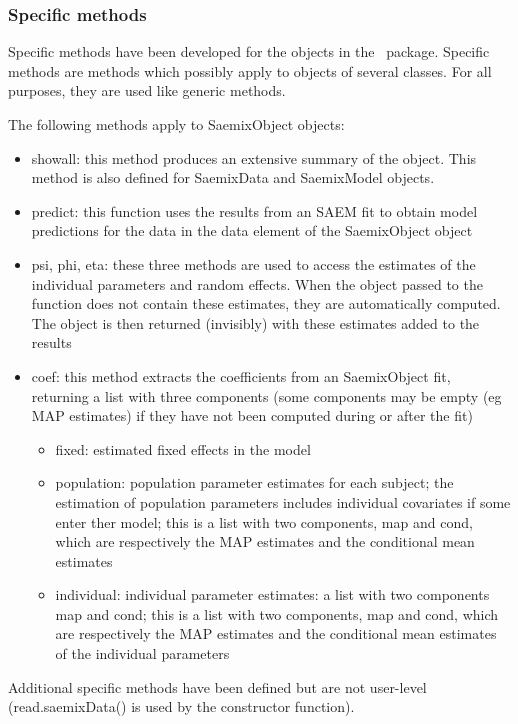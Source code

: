 \subsubsection{Specific methods}

Specific methods have been developed for the objects in the \monolix~package. Specific methods are methods which possibly apply to objects of several classes. For all purposes, they are used like generic methods.

The following methods apply to {\sf SaemixObject} objects:
\begin{itemize}
\item showall: this method produces an extensive summary of the object. This method is also defined for {\sf SaemixData} and {\sf SaemixModel} objects.
\item predict: this function uses the results from an SAEM fit to obtain model predictions for the data in the {\sf data} element of the {\sf SaemixObject} object
\item psi, phi, eta: these three methods are used to access the estimates of the individual parameters and random effects.  When the object passed to the function does not contain these estimates, they are automatically computed. The object is then returned (invisibly) with these estimates added to the results
\item coef: this method extracts the coefficients from an {\sf SaemixObject} fit, returning a list with three components (some components may be empty (eg MAP estimates) if they have not been computed during or after the fit)
   \begin{itemize}
   \item fixed: estimated fixed effects in the model
   \item population: population parameter estimates for each subject; the estimation of population parameters includes individual covariates if some enter ther model; this is a list with two components, map and cond, which are respectively the MAP estimates and the conditional mean estimates
   \item individual: individual parameter estimates: a list with two components map and cond; this is a list with two components, map and cond, which are respectively the MAP estimates and the conditional mean estimates of the individual parameters
   \end{itemize}
\end{itemize}

Additional specific methods have been defined but are not user-level ({\sf read.saemixData()} is used by the constructor function).

